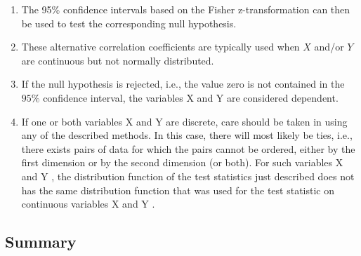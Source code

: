 \begin{enumerate}
\begin{enumerate}
        \item The 95\% confidence intervals based on the Fisher z-transformation can then be used to test the corresponding null hypothesis.
        \hfill \cite{statistics/book/Statistics-for-Data-Scientists/Maurits-Kaptein}

        \item These alternative correlation coefficients are typically used when $X$ and/or $Y$ are continuous but not normally distributed.
        \hfill \cite{statistics/book/Statistics-for-Data-Scientists/Maurits-Kaptein}

        \item If the null hypothesis is rejected, i.e., the value zero is not contained in the $95\%$ confidence interval, the variables X and Y are considered dependent.
        \hfill \cite{statistics/book/Statistics-for-Data-Scientists/Maurits-Kaptein}

        \item If one or both variables X and Y are discrete, care should be taken in using any of the described methods. 
        In this case, there will most likely be ties, i.e., there exists pairs of data for which the pairs cannot be ordered, either by the first dimension or by the second dimension (or both).
        For such variables X and Y , the distribution function of the test statistics just described does not has the same distribution function that was used for the test statistic on continuous variables X and Y .
        \hfill \cite{statistics/book/Statistics-for-Data-Scientists/Maurits-Kaptein}
    \end{enumerate}
\end{enumerate}










\subsection{Summary}

